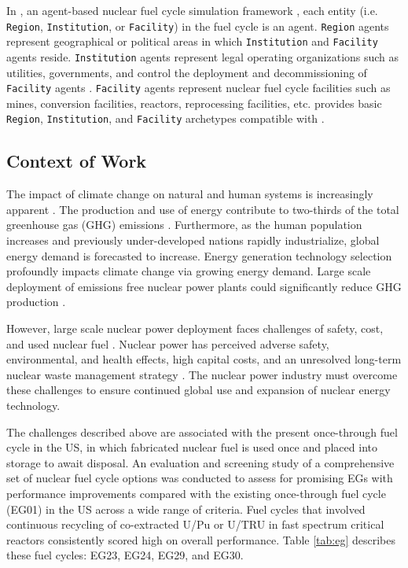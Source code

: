In \Cyclus, an agent-based nuclear fuel cycle simulation framework 
\cite{huff_fundamental_2016}, 
each entity (i.e. \texttt{Region}, \texttt{Institution}, or \texttt{Facility}) in the 
fuel cycle is an agent. 
\texttt{Region} agents represent geographical or political areas in which \texttt{Institution}
and \texttt{Facility} agents reside. 
\texttt{Institution} agents represent legal operating organizations such as
utilities, governments, and control the 
deployment and decommissioning of \texttt{Facility} agents
\cite{huff_fundamental_2016}.
\texttt{Facility} agents represent nuclear fuel cycle facilities
such as mines, conversion facilities, reactors, reprocessing facilities, 
etc. 
\Cycamore \cite{carlsen_cycamore_2014}
provides basic \texttt{Region}, \texttt{Institution}, 
and \texttt{Facility} archetypes compatible with \Cyclus. 

\subsection{Context of Work}
The impact of climate change on natural and human systems 
is increasingly apparent \cite{noauthor_climate_2018}.
The production and use of energy contribute to 
two-thirds of the total greenhouse gas (GHG) 
emissions \cite{noauthor_climate_2018}.
Furthermore, as the human population increases and previously 
under-developed nations rapidly industrialize, 
global energy demand is forecasted to increase. 
Energy generation technology selection 
profoundly impacts climate change via growing energy demand. 
Large scale deployment of emissions free nuclear power plants 
could significantly reduce GHG production 
\cite{noauthor_climate_2018}.    

However, large scale nuclear power deployment faces
challenges of safety, cost, and used nuclear fuel  
\cite{petti_future_2018}. 
Nuclear power has perceived adverse safety, environmental, and health 
effects, high capital costs, and 
an unresolved long-term nuclear waste management 
strategy \cite{petti_future_2018}. 
The nuclear power industry must overcome these challenges 
to ensure continued global use and expansion 
of nuclear energy technology. 

The challenges described above are associated with 
the present once-through fuel cycle in the \gls{US}, 
in which fabricated nuclear fuel is used once and placed into 
storage to await disposal. 
An evaluation and screening study of a comprehensive set of nuclear 
fuel cycle options \cite{wigeland_nuclear_2014} was conducted to assess 
for promising \glspl{EG} with performance improvements compared with 
the existing once-through 
fuel cycle (EG01) in the \gls{US} across a wide range of criteria. 
Fuel cycles that involved continuous recycling
of co-extracted U/Pu or U/TRU in fast spectrum critical reactors
consistently scored high on overall performance.  
Table \ref{tab:eg} describes these fuel cycles:
EG23, EG24, EG29, and EG30. 

